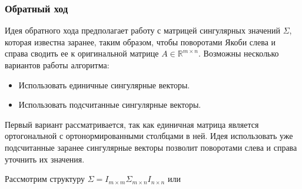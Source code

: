 \subsubsection{Обратный ход}

Идея обратного хода предполагает работу с матрицей сингулярных значений $\Sigma$, которая известна заранее, таким образом, чтобы поворотами Якоби слева и справа сводить ее к оригинальной матрице $A \in \mathbb{R}^{m\times n}$. Возможны несколько вариантов работы алгоритма: 
\begin{itemize}
    \item Использовать единичные сингулярные векторы.
    \item Использовать подсчитанные сингулярные векторы.
\end{itemize}
Первый вариант рассматривается, так как единичная матрица является ортогональной с ортонормированными столбцами в ней. 
Идея использовать уже подсчитанные заранее сингулярные векторы позволит поворотами слева и справа уточнить их значения. 

Рассмотрим структуру $\Sigma = I_{m\times m}\Sigma_{m\times n}I_{n\times n}$ или

